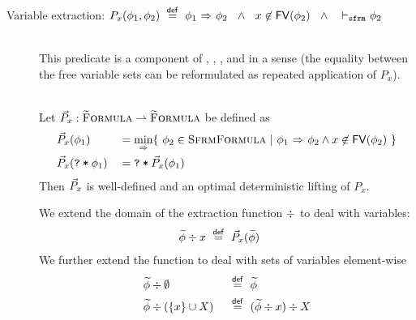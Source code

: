 \begin{description}
    \item[Variable extraction: $P_x(\phi_1, \phi_2) ~\overset{\textup{\textmd{\textsf{def}}}}{=}~ {\phi_1} \,\,{\Rightarrow}\,\, {\phi_2} ~~\wedge~~ x \not \in \textup{\textmd{\textsf{FV}}}(\phi_2) ~~\wedge~~ \,\,{\vdash_\texttt{sfrm}}\,\, \phi_2$]~\\
    This predicate is a component of , , ,  and in a sense  (the equality between the free variable sets can be reformulated as repeated application of $P_x$).
    \begin{lemma}~\\
        Let $\vec{P}_x : \textup{\textsc{\ensuremath{\widetilde{\text{F}}}ormula}} \rightharpoonup \textup{\textsc{\ensuremath{\widetilde{\text{F}}}ormula}}$ be defined as
        \begin{alignat*}{2}
        & \vec{P}_x(\phi_1)          & &= \underset{{} \,\,{\Rightarrow}\,\, {}}{\min} \{~ \phi_2 \in \textup{\textsc{SfrmFormula}} ~|~ {\phi_1} \,\,{\Rightarrow}\,\, {\phi_2} \wedge x \not \in \textup{\textmd{\textsf{FV}}}(\phi_2) ~\} \\
        & \vec{P}_x(\textup{\texttt{\textup{\texttt{?}}\:*\:\ensuremath{\phi_1}}}) & &= \textup{\texttt{\textup{\texttt{?}}\:*\:\ensuremath{\vec{P}_x(\phi_1)}}}
        \end{alignat*}
        Then $\vec{P}_x$ is well-defined and an optimal deterministic lifting of $P_x$.
    \end{lemma}
    We extend the domain of the extraction function $\div$ to deal with variables:
    \begin{alignat*}{2}
    & \widetilde{\phi}\div x ~\overset{\textup{\textmd{\textsf{def}}}}{=}~ \vec{P}_x(\widetilde{\phi}) & ~
    \end{alignat*}
    We further extend the function to deal with sets of variables element-wise
    \begin{alignat*}{2}
    & \widetilde{\phi}\div\emptyset        & & ~\overset{\textup{\textmd{\textsf{def}}}}{=}~ \widetilde{\phi}                   \\
    & \widetilde{\phi}\div(\{ x \} \cup X) & & ~\overset{\textup{\textmd{\textsf{def}}}}{=}~ (\widetilde{\phi}\div x)\div X
    \end{alignat*}
\end{description}
